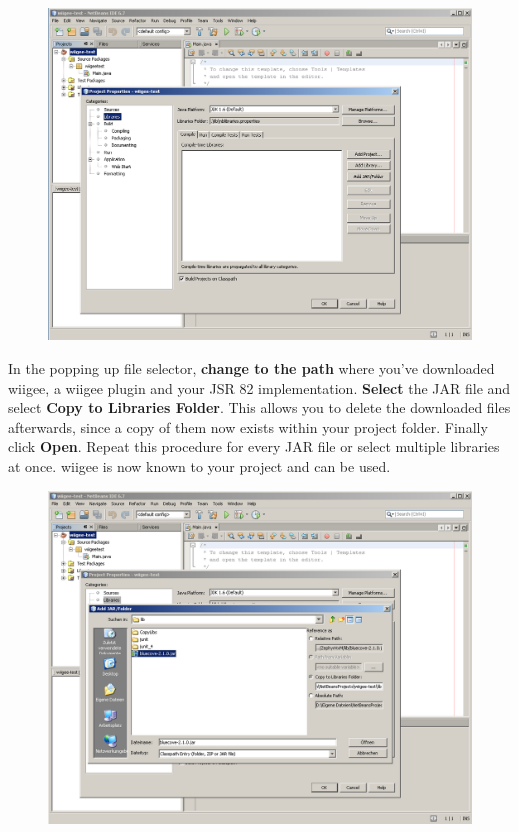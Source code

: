 \documentclass[%
   11pt,              %
   english,           %
   a4paper,           %
   DIV11,             %
   BCOR12mm,		  %
   titlepage,		  %
   bibtotoc,		  %
   liststotoc,		  %
   final,			  %
   twoside,			  %
   openright,		  %
   cleardoubleempty   %
]{scrreprt}%
\begin{document}
\begin{figure}[h!]
\centering
\includegraphics[width=0.95\linewidth]{img/setup/netbeans/step3.png}
\end{figure}

In the popping up file selector, \textbf{change to the path} where you've downloaded wiigee, a wiigee plugin and your JSR 82 implementation. \textbf{Select} the JAR file and select \textbf{Copy to Libraries Folder}. This allows you to delete the downloaded files afterwards, since a copy of them now exists within your project folder. Finally click \textbf{Open}. Repeat this procedure for every JAR file or select multiple libraries at once. wiigee is now known to your project and can be used.

\begin{figure}[h!]
\centering
\includegraphics[width=0.95\linewidth]{img/setup/netbeans/step4.png}
\end{figure}
\end{document}
